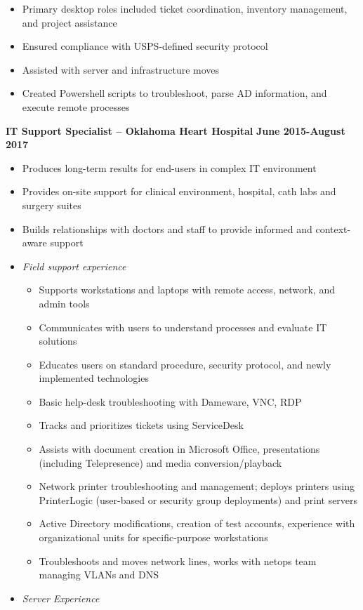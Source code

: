 \documentclass[centered]{res}
\begin{document}
\begin{resume}
\begin{itemize}
\item Primary desktop roles included ticket coordination, inventory management, and project assistance
\item Ensured compliance with USPS-defined security protocol
\item Assisted with server and infrastructure moves
\item Created Powershell scripts to troubleshoot, parse AD information, and execute remote processes
\end{itemize}
\textbf{IT Support Specialist -- Oklahoma Heart Hospital}
\newline
\textbf{June 2015-August 2017}
\begin{itemize}
	\item Produces long-term results for end-users in complex IT environment
	\item Provides on-site support for clinical environment, hospital, cath labs and surgery suites
	\item Builds relationships with doctors and staff to provide informed and context-aware support
	\item \textsl{Field support experience}
		\begin{itemize}
			\item Supports workstations and laptops with remote access, network, and admin tools
			\item Communicates with users to understand processes and evaluate IT solutions
			\item Educates users on standard procedure, security protocol, and newly implemented technologies
			\item Basic help-desk troubleshooting with Dameware, VNC, RDP
			\item Tracks and prioritizes tickets using ServiceDesk
			\item Assists with document creation in Microsoft Office, presentations (including Telepresence) and media conversion/playback
			\item Network printer troubleshooting and management; deploys printers using PrinterLogic (user-based or security group deployments) and print servers
			\item Active Directory modifications, creation of test accounts, experience with organizational units for specific-purpose workstations
			\item Troubleshoots and moves network lines, works with netops team managing VLANs and DNS
			\end{itemize}		
		\item \textsl{Server Experience}

\end{itemize}
\end{resume}
\end{document}
